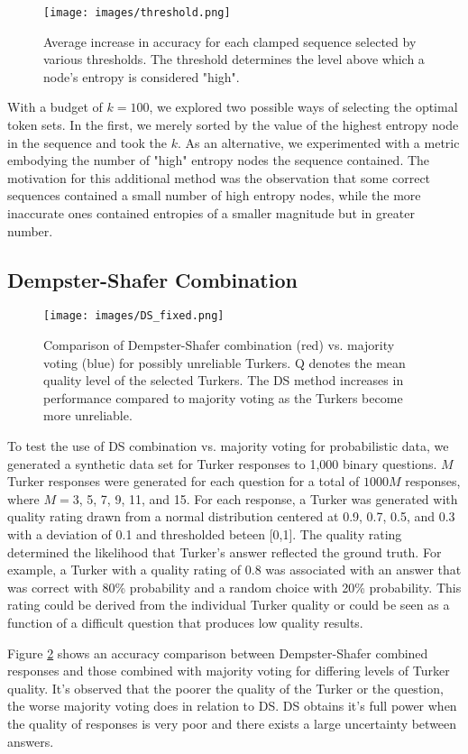 \begin{figure}
\centering
\texttt{[image: images/threshold.png]}
\caption[example] { 
\label{fig:thresh} 
Average increase in accuracy for each clamped sequence selected by various thresholds.  The threshold determines the level above which a node's entropy is considered "high".}
\end{figure} 

With a budget of $k=100$, we explored two possible ways of selecting the optimal token sets.  In the first, we merely sorted by the value of the highest entropy node in the sequence and took the $k$.  As an alternative, we experimented with a metric embodying the number of "high" entropy nodes the sequence contained.  The motivation for this additional method was the observation that some correct sequences contained a small number of high entropy nodes, while the more inaccurate ones contained entropies of a smaller magnitude but in greater number.

\subsection{Dempster-Shafer Combination}

\begin{figure}
\centering
\texttt{[image: images/DS\_fixed.png]}
\caption[example] { 
\label{fig:DS} 
Comparison of Dempster-Shafer combination (red) vs. majority voting (blue) for possibly unreliable Turkers.  Q denotes the mean quality level of the selected Turkers.  The DS method increases in performance compared to majority voting as the Turkers become more unreliable.}
\end{figure} 

To test the use of DS combination vs. majority voting for probabilistic data, we generated a synthetic data set for Turker responses to 1,000 binary questions.  $M$ Turker responses were generated for each question for a total of $1000M$ responses, where $M = $3, 5, 7, 9, 11, and 15.  For each response, a Turker was generated with quality rating drawn from a normal distribution centered at 0.9, 0.7, 0.5, and 0.3 with a deviation of 0.1 and thresholded beteen [0,1].  The quality rating determined the likelihood that Turker's answer reflected the ground truth.  For example, a Turker with a quality rating of 0.8 was associated with an answer that was correct with 80\% probability and a random choice with 20\% probability.  This rating could be derived from the individual Turker quality or could be seen as a function of a difficult question that produces low quality results.

Figure \ref{fig:DS} shows an accuracy comparison between Dempster-Shafer combined responses and those combined with majority voting for differing levels of Turker quality.  It's observed that the poorer the quality of the Turker or the question, the worse majority voting does in relation to DS.  DS obtains it's full power when the quality of responses is very poor and there exists a large uncertainty between answers.
